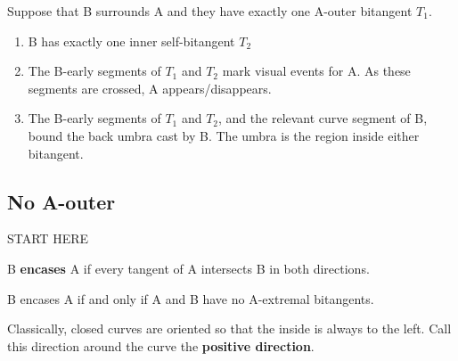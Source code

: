 \documentclass[12pt]{article}
\newif\ifCommentary             %
\begin{document}
\vspace{.5in}

\begin{lemma}
Suppose that B surrounds A and they have exactly one A-outer bitangent $T_1$.
\begin{enumerate}
\item B has exactly one inner self-bitangent $T_2$ 
\item The B-early segments of $T_1$ and $T_2$ mark visual events for A.
      As these segments are crossed, A appears/disappears.
\item The B-early segments of $T_1$ and $T_2$, and the relevant curve segment of B,
      bound the back umbra cast by B.
      The umbra is the region inside either bitangent.
\end{enumerate}
\end{lemma}
\prf
\QED

\clearpage

\subsection{No A-outer}
\label{sec:noaouter}

START HERE

\begin{defn2}
B {\bf encases} A if every tangent of A intersects B in both directions.
\end{defn2}

\begin{lemma}
B encases A if and only if A and B have no A-extremal bitangents.
\end{lemma}

\ifCommentary
{\em Figure of encasing curve, from bottom of p. 23 of Bellsouth workbook}
\fi

\ifCommentary
Encasing another curve is stronger than surrounding it.
Correspondingly, encasing curves more stringently restrict the region that 
sees the encased curve (Lemma~\ref{lem:countOuter}).
\fi

\begin{defn2}
Classically, closed curves are oriented so that the inside is always to the left.
Call this direction around the curve the {\bf positive direction}.
\end{defn2}
\end{document}
